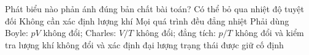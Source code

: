 \begin{ex}
Phát biểu nào phản ánh đúng bản chất bài toán?
\choice
{Có thể bỏ qua nhiệt độ tuyệt đối}
{Không cần xác định lượng khí}
{Mọi quá trình đều đẳng nhiệt}
{\True Phải dùng Boyle: $pV$ không đổi; Charles: $V/T$ không đổi; đẳng tích: $p/T$ không đổi và kiểm tra lượng khí không đổi và xác định đại lượng trạng thái được giữ cố định}
\end{ex}
